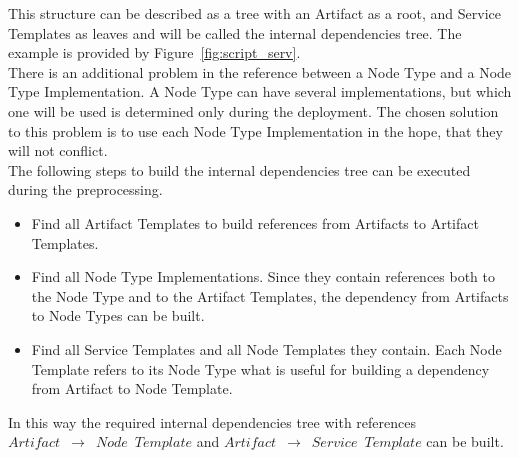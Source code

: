 This structure can be described as a tree with an Artifact as a root, and Service Templates as leaves and will be called the internal dependencies tree.
The example is provided by Figure~\ref{fig:script_serv}.\\
There is an additional problem in the reference between a Node Type and a Node Type Implementation.
A Node Type can have several implementations, but which one will be used is determined only during the deployment. 
The chosen solution to this problem is to use each Node Type Implementation in the hope, that they will not conflict.\\
The following steps to build the internal dependencies tree can be executed during the preprocessing.
\begin{itemize}
	\item Find all Artifact Templates to build references from Artifacts to Artifact Templates.
	\item Find all Node Type Implementations. 
		Since they contain references both to the Node Type and to the Artifact Templates, the dependency from Artifacts to Node Types can be built.
	\item Find all Service Templates and all Node Templates they contain. 
		Each Node Template refers to its Node Type what is useful for building a dependency from Artifact to Node Template.
\end{itemize} 
In this way the required internal dependencies tree with references \\$Artifact$~$\rightarrow$~$Node$~$Template$ and $Artifact$~$\rightarrow$~$Service$~$Template$ can be built.


